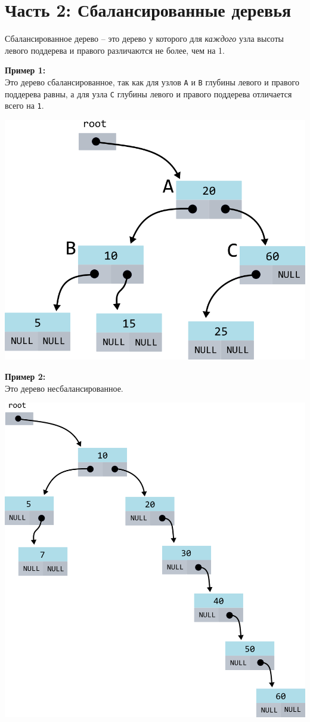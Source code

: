 \documentclass{article}
\begin{document}
\section*{Часть 2: Сбалансированные деревья} 
Сбалансированное дерево -- это дерево у которого для \textit{каждого} узла высоты левого поддерева и правого различаются не более, чем на 1.
\begin{multicols}{2}
\textbf{Пример 1:}\\
Это дерево сбалансированное, так как для узлов \texttt{A} и \texttt{B} глубины левого и правого поддерева равны,
а для узла \texttt{C} глубины левого и правого поддерева отличается всего на \texttt{1}.

\begin{center}
\includegraphics[scale=0.8]{../images/balanced_tree.png}
\end{center}
\vfill\null
\columnbreak
\textbf{Пример 2:} \\
Это дерево несбалансированное.
\begin{center}
\includegraphics[scale=0.9]{../images/unbalanced_tree.png}

\end{center}
\end{multicols}
\end{document}
